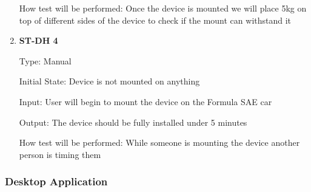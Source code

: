 \documentclass[12pt, titlepage]{article}
\begin{document}
\begin{enumerate}
    How test will be performed: Once the device is mounted we will place 5kg on top of different sides of the device to check if the mount can withstand it \\

    \item{\bf{ST-DH 4}}
    
    Type: Manual
              
    Initial State: Device is not mounted on anything
              
    Input: User will begin to mount the device on the Formula SAE car
              
    Output: The device should be fully installed under 5 minutes
    
              
    How test will be performed: While someone is mounting the device another person is timing them \\
  
    \end{enumerate}


\subsubsection{Desktop Application}
\end{document}
